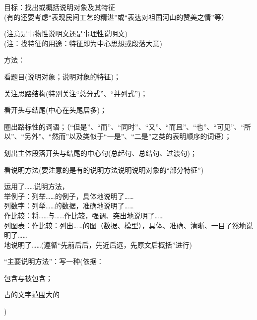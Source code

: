 目标：找出或概括说明对象及其特征\\
(有的还要考虑``表现民间工艺的精湛''或``表达对祖国河山的赞美之情''等）\par
(注意是事物性说明文还是事理性说明文)\\
(注：找特征的用途：特征即为中心思想或段落大意)\par
方法：\begin{asparaenum}[(1)]\item 看题目(说明对象；说明对象的特征)；
        \item 关注思路结构(特别关注``总分式''、``并列式'')；
        \item 看开头与结尾(中心在头尾居多)；
        \item 圈出路标性的词语；（``但是''、``而''、``同时''、``又''、``而且''、``也''、``可见''、``所以''、``另外''、``然而''以及类似于``一是''、``二是''之类的表明顺序的词语）；
        \item 划出主体段落开头与结尾的中心句(总起句、总结句、过渡句)；
        \item 看说明方法(要注意的是有的说明方法说明说明对象的``部分特征'')\end{asparaenum}

运用了\ldots{}\ldots{}说明方法，\\
举例子：列举\ldots{}\ldots{}的例子，具体地说明了\ldots{}\ldots{}\\
列数字：列举\ldots{}\ldots{}的数据，准确地说明了\ldots{}\ldots{}\\
作比较：将\ldots{}\ldots{}与\ldots{}\ldots{}作比较，强调、突出地说明了\ldots{}\ldots{}\\
列图表：作比较：列出\ldots{}\ldots{}的图（数据、模型），具体、准确、清晰、一目了然地说明了\ldots{}\ldots{}\\
地说明了\ldots{}\ldots{}(遵循``先前后后，先近后远，先原文后概括''进行)\par
``主要说明方法''：写一种(依据：\begin{inparaenum}[(1)]\item 包含与被包含；\item 占的文字范围大的\end{inparaenum})\\
\\
\\
\\
\\

